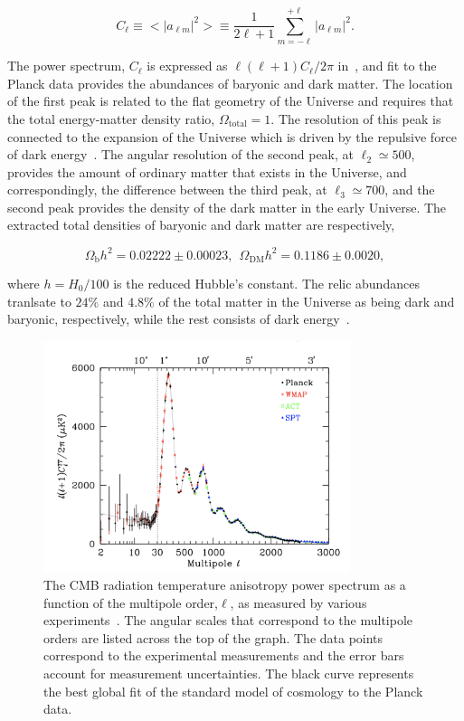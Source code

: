 \begin{equation}
  C_{\ell} \equiv <|a_{\ell m}|^{2}> \equiv \frac{1}{2\ell+1}\sum^{+\ell}_{m=-\ell}|a_{\ell m}|^2.
\end{equation}

The power spectrum, $C_{\ell}$ is expressed as $\ell(\ell+1)C_{\ell}/2\pi$ in~, and fit to the Planck data provides the abundances of baryonic and dark matter. The location of the first peak is related to the flat geometry of the Universe and requires that the total energy-matter density ratio, $\Omega_\mathrm{total}=1$. The resolution of this peak is connected to the expansion of the Universe which is driven by the repulsive force of dark energy~\cite{Spergel:2006hy}. The angular resolution of the second peak, at $\ell_{2}\simeq500$, provides the amount of ordinary matter that exists in the Universe, and correspondingly, the difference between the third peak, at $\ell_{3}\simeq700$, and the second peak provides the density of the dark matter in the early Universe. The extracted total densities of baryonic and dark matter are respectively,

\begin{equation}
  \Omega_{\mathrm{b}}h^2 = 0.02222 \pm 0.00023,\:\:\Omega_{\mathrm{DM}}h^2 = 0.1186 \pm 0.0020,
\end{equation}

where $h = H_{0}/100$ is the reduced Hubble's constant. The relic abundances tranlsate to $24\%$ and $4.8\%$ of the total matter in the Universe as being dark and baryonic, respectively, while the rest consists of dark energy~\cite{Agashe:2014kda}.

\begin{figure}
  \centering
  \includegraphics[width=0.8\textwidth]{figs/CMB_multipole}
  \caption{The CMB radiation temperature anisotropy power spectrum as a function of the multipole order,$\ell$, as measured by various experiments~\cite{Agashe:2014kda}. The angular scales that correspond to the multipole orders are listed across the top of the graph. The data points correspond to the experimental measurements and the error bars account for measurement uncertainties. The black curve represents the best global fit of the standard model of cosmology to the Planck data.}
  \label{fig:CMB}
\end{figure}

